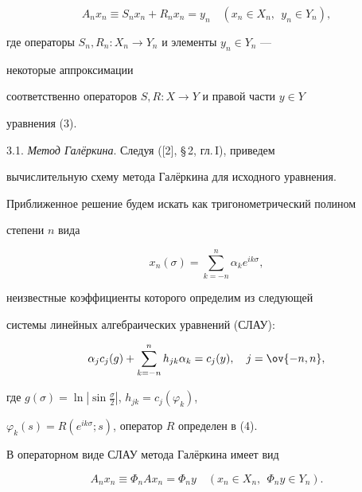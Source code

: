 \begin{equation} 


A_n x_n\equiv S_n x_n+R_n x_n=y_n\quad 


(x_n\in X_n,\ \ y_n\in Y_n), 


\end{equation} 


где операторы $S_n,R_n:X_n\to Y_n$ и элементы $y_n\in Y_n$ --- 


некоторые аппроксимации 


соответственно операторов $S,R:X\to Y$ и правой части $y\in Y$ 


уравнения (3). 


\medskip 


 


3.1. {\it Метод Гал\"еркина}. Следуя ([2], \S\,2, гл.\,I), приведем 


вычислительную схему метода Гал\"ер\-ки\-на для исходного уравнения. 


Приближенное решение будем искать как тригонометрический полином 


степени $n$ вида 


\begin{equation} 


x_n(\sigma)=\sum^n_{k=-n}\alpha_k e^{ik\sigma}, 


\end{equation} 


неизвестные коэффициенты которого определим из следующей 


системы линейных алгебраических уравнений (СЛАУ): 


$$ 


\alpha_j c_j(g)+\sum^n_{k=-n}h_{jk}\alpha_k=c_j(y),\quad 


j=\ov{-n,n}, 


$$ 


где $g(\sigma)=\ln|\sin\frac{\sigma}{2}|$, $h_{jk}=c_j(\varphi_k)$, 


$\varphi_k(s)=R(e^{ik\sigma};s)$, оператор $R$ определен в (4). 


 


В операторном виде СЛАУ метода Гал\"еркина имеет вид 


\begin{equation} 


A_n x_n\equiv\Phi_n Ax_n=\Phi_n y\quad 


(x_n\in X_n,\ \ \Phi_n y\in Y_n). 


\end{equation} 


